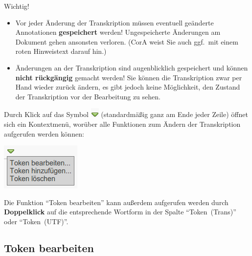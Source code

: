 \documentclass[11pt,a4paper,parskip=half]{scrartcl}
\begin{document}
\begin{alertbox}{Wichtig!}
  \begin{itemize}\vspace{-1.5em}
  \item Vor jeder Änderung der Transkription müssen eventuell
    geänderte Annotationen \textbf{gespeichert} werden!
    Ungespeicherte Änderungen am Dokument gehen ansonsten verloren.
    (CorA weist Sie auch ggf.\ mit einem roten Hinweistext darauf
    hin.)
  \item Änderungen an der Transkription sind augenblicklich
    gespeichert und können \textbf{nicht rückgängig} gemacht werden!
    Sie können die Transkription zwar per Hand wieder zurück ändern,
    es gibt jedoch keine Möglichkeit, den Zustand der Transkription
    vor der Bearbeitung zu sehen.
  \end{itemize}
\end{alertbox}

Durch Klick auf das
Symbol \includegraphics[height=\baselineskip]{img/dropdown.png}
(standardmäßig ganz am Ende jeder Zeile) öffnet sich ein Kontextmenü,
worüber alle Funktionen zum Ändern der Transkription aufgerufen werden
können:

\begin{center}
  \includegraphics[width=0.25\linewidth]{img/dropdown-menu.png}
\end{center}

Die Funktion "`Token bearbeiten"' kann außerdem aufgerufen werden
durch \textbf{Doppelklick} auf die entsprechende Wortform in der
Spalte "`Token~(Trans)"' oder "`Token~(UTF)"'.

\subsection{Token bearbeiten}
\label{sec:trans-edit}
\end{document}
